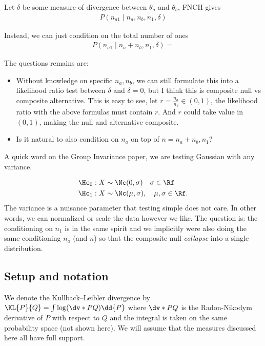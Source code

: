 Let $\delta$ be some measure of divergence between $\theta_a$ and $\theta_b$,
FNCH gives
\begin{align*}
	P(n_{a1} \mid n_a,n_b,n_1,\delta)
\end{align*}

Instead, we can just condition on the total number of ones
\begin{align*}
	P(n_{a1} \mid n_a+n_b,n_1,\delta) =
\end{align*}

The questions remains are:
\begin{itemize}
	\item Without knowledge on specific $n_a,n_b$,
	      we can still formulate this into a likelihood ratio test between $\delta$ and $\delta=0$,
	      but I think this is composite null vs composite alternative.
	      This is easy to see, let $r=\frac{n_a}{n_b}\in(0,1)$,
	      the likelihood ratio with the above formulas must contain $r$.
	      And $r$ could take value in $(0,1)$, making the null and alternative composite.
	\item Is it natural to also condition on $n_a$ on top of $n=n_a+n_b, n_1$?
\end{itemize}


A quick word on the Group Invariance paper, we are testing Gaussian with any variance.

\begin{align*}
	 & \Hc_0: X \sim \Nc(0, \sigma)  \quad \sigma \in \Rf         \\
	 & \Hc_1: X \sim \Nc(\mu, \sigma), \quad \mu, \sigma \in \Rf.
\end{align*}
The variance is a nuisance parameter that testing simple does not care.
In other words, we can normalized or scale the data however we like.
The question is: the conditioning on $n_1$ is in the same spirit
and we implicitly were also doing the same conditioning $n_a$ (and $n$)
so that the composite null \emph{collapse} into a single distribution.


\subsection{Setup and notation}

We denote the Kullback–Leibler divergence by $\KL{P}{Q} = \int \log(\dv*{P}{Q}) \dd{P}$
where $\dv*{P}{Q}$ is the Radon-Nikodym derivative of $P$ with respect to $Q$ and
the integral is taken on the same probability space (not shown here).
We will assume that the measures discussed here all have full support.

